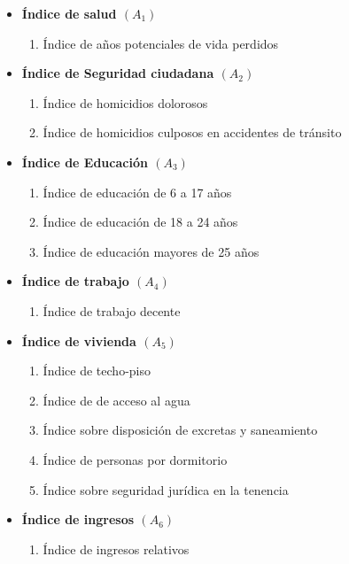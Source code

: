 \documentclass[
]{book}
\providecommand{\tightlist}{%
  \setlength{\itemsep}{0pt}\setlength{\parskip}{0pt}}
\begin{document}
\begin{itemize}
\tightlist
\item
  \textbf{Índice de salud \((A_1)\)}

  \begin{enumerate}
  \def\labelenumi{\arabic{enumi}.}
  \tightlist
  \item
    Índice de años potenciales de vida perdidos
  \end{enumerate}
\item
  \textbf{Índice de Seguridad ciudadana \((A_2)\)}

  \begin{enumerate}
  \def\labelenumi{\arabic{enumi}.}
  \setcounter{enumi}{1}
  \tightlist
  \item
    Índice de homicidios dolorosos
  \item
    Índice de homicidios culposos en accidentes de tránsito
  \end{enumerate}
\item
  \textbf{Índice de Educación \((A_3)\)}

  \begin{enumerate}
  \def\labelenumi{\arabic{enumi}.}
  \setcounter{enumi}{3}
  \tightlist
  \item
    Índice de educación de 6 a 17 años
  \item
    Índice de educación de 18 a 24 años
  \item
    Índice de educación mayores de 25 años
  \end{enumerate}
\item
  \textbf{Índice de trabajo \((A_4)\)}

  \begin{enumerate}
  \def\labelenumi{\arabic{enumi}.}
  \setcounter{enumi}{6}
  \tightlist
  \item
    Índice de trabajo decente
  \end{enumerate}
\item
  \textbf{Índice de vivienda \((A_5)\)}

  \begin{enumerate}
  \def\labelenumi{\arabic{enumi}.}
  \setcounter{enumi}{7}
  \tightlist
  \item
    Índice de techo-piso
  \item
    Índice de de acceso al agua
  \item
    Índice sobre disposición de excretas y saneamiento
  \item
    Índice de personas por dormitorio
  \item
    Índice sobre seguridad jurídica en la tenencia
  \end{enumerate}
\item
  \textbf{Índice de ingresos \((A_6)\)}

  \begin{enumerate}
  \def\labelenumi{\arabic{enumi}.}
  \setcounter{enumi}{12}
  \tightlist
  \item
    Índice de ingresos relativos
  \end{enumerate}
\end{itemize}
\end{document}
